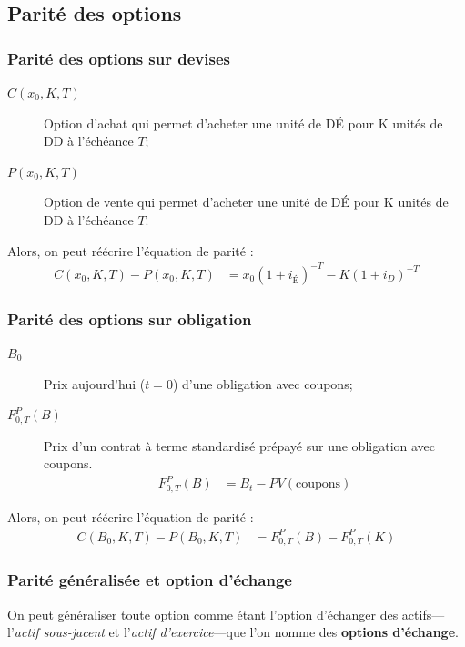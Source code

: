 \documentclass[10pt, french]{article}
\begin{document}
\begin{multicols*}{2}
\columnbreak
\subsection{Parité des options}

\subsubsection*{Parité des options sur devises}
\begin{description}
	\item[$C(x_0, K, T)$]	Option d'achat qui permet d'acheter une unité de DÉ pour K unités de DD à l'échéance $T$;
	\item[$P(x_0, K, T)$] 	Option de vente qui permet d'acheter une unité de DÉ pour K unités de DD à l'échéance $T$.
\end{description}

Alors, on peut réécrire l'équation de parité : 
\begin{align*}
	C(x_0, K,T) - P(x_0, K, T) 
	&= 	x_0 (1 + i_{\text{É}})^{-T} - K(1 + i_D)^{-T}
\end{align*}

\subsubsection*{Parité des options sur obligation}
\begin{description}
	\item[$B_{0}$]	Prix aujourd'hui ($t = 0$) d'une obligation avec coupons;
	\item[$F_{0, T}^{P}(B)$]	Prix d'un contrat à terme standardisé prépayé sur une obligation avec coupons.
		\setlength{\mathindent}{-1cm}
		\begin{align*}
		F_{0, T}^{P}(B) 
		&=	B_{t} - PV(\text{coupons})
		\end{align*}
		\setlength{\mathindent}{1cm}
\end{description}

Alors, on peut réécrire l'équation de parité : 
\begin{align*}
	C(B_{0}, K, T) - P(B_{0}, K, T) 
	&= 	F_{0, T}^{P}(B) - F_{0, T}^{P}(K)
\end{align*}

\subsubsection*{Parité généralisée et option d'échange}
On peut généraliser toute option comme étant l'option d'échanger des actifs---l'\textit{actif sous-jacent} et l'\textit{actif d'exercice}---que l'on nomme des \textbf{options d'échange}.\\


\end{multicols*}
\end{document}
